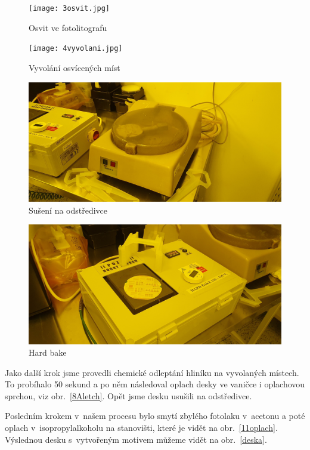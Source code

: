 \documentclass[a4paper,12pt]{article}
\begin{document}
\begin{figure}[h!]
	\centering
	\texttt{[image: 3osvit.jpg]}
	\caption{Osvit ve fotolitografu}
	\label{3osvit}
\end{figure}

\newpage
\begin{figure}[h!]
	\centering
	\texttt{[image: 4vyvolani.jpg]}
	\caption{Vyvolání osvícených míst}
	\label{4vyvolani}
\end{figure}

\begin{figure}[h!]
	\centering
	\includegraphics[width=130mm]{5odstredeni.jpg}
	\caption{Sušení na odstředivce}
	\label{5odstredeni}
\end{figure}

\begin{figure}[h!]
	\centering
	\includegraphics[width=130mm]{7hardbake.jpg}
	\caption{Hard bake}
	\label{7hardbake}
\end{figure}

\newpage
Jako další krok jsme provedli chemické odleptání hliníku na vyvolaných místech. 
To probíhalo 50 sekund a po něm následoval oplach desky ve vaničce i oplachovou 
sprchou, viz obr.~\ref{8Aletch}. Opět jsme desku usušili na odstředivce.

Posledním krokem v~našem procesu bylo smytí zbylého fotolaku v~acetonu a poté 
oplach v~isopropylalkoholu na stanovišti, které je vidět na 
obr.~\ref{11oplach}. Výslednou desku s~vytvořeným motivem můžeme vidět na 
obr.~\ref{deska}.
\end{document}
